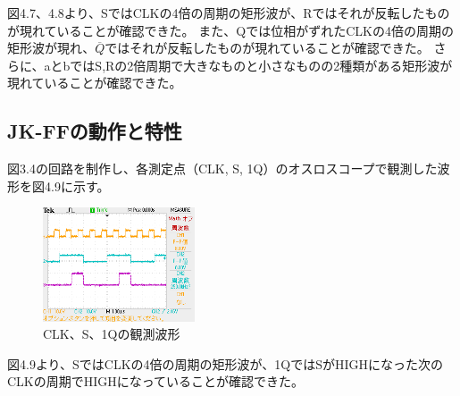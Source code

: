 \documentclass{jlreq}
\numberwithin{equation}{section}
\begin{document}
図4.7、4.8より、SではCLKの4倍の周期の矩形波が、Rではそれが反転したものが現れていることが確認できた。
また、Qでは位相がずれたCLKの4倍の周期の矩形波が現れ、\(\overline{Q}\)ではそれが反転したものが現れていることが確認できた。
さらに、aとbではS,Rの2倍周期で大きなものと小さなものの2種類がある矩形波が現れていることが確認できた。

\subsection{JK-FFの動作と特性}
図3.4の回路を制作し、各測定点（CLK, S, 1Q）のオスロスコープで観測した波形を図4.9に示す。

\begin{figure}[H]
  \centering
  \includegraphics[width=0.4\textwidth]{assets/jkff.png}
  \caption{CLK、S、1Qの観測波形}
\end{figure}

図4.9より、SではCLKの4倍の周期の矩形波が、1QではSがHIGHになった次のCLKの周期でHIGHになっていることが確認できた。
\end{document}
